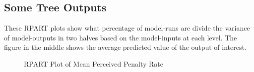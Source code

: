 \documentclass{article}
\begin{document}
\subsection{Some Tree Outputs}
These RPART plots show what percentage of model-runs are divide the variance of model-outputs in two halves based on the model-inputs at each level. The figure in the middle shows the average predicted value of the output of interest. 

  \begin{figure}[ht]
		\caption{RPART Plot of Mean Perceived Penalty Rate}
	\end{figure}
      
\end{document}
